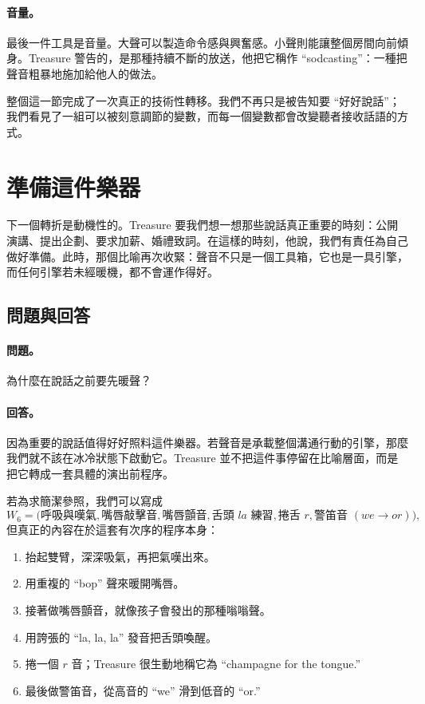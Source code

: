 \paragraph{音量。} 最後一件工具是音量。大聲可以製造命令感與興奮感。小聲則能讓整個房間向前傾身。Treasure 警告的，是那種持續不斷的放送，他把它稱作 ``sodcasting''：一種把聲音粗暴地施加給他人的做法。

整個這一節完成了一次真正的技術性轉移。我們不再只是被告知要 ``好好說話''；我們看見了一組可以被刻意調節的變數，而每一個變數都會改變聽者接收話語的方式。

\section{準備這件樂器}

下一個轉折是動機性的。Treasure 要我們想一想那些說話真正重要的時刻：公開演講、提出企劃、要求加薪、婚禮致詞。在這樣的時刻，他說，我們有責任為自己做好準備。此時，那個比喻再次收緊：聲音不只是一個工具箱，它也是一具引擎，而任何引擎若未經暖機，都不會運作得好。

\subsection{問題與回答}

\paragraph{問題。} 為什麼在說話之前要先暖聲？

\paragraph{回答。} 因為重要的說話值得好好照料這件樂器。若聲音是承載整個溝通行動的引擎，那麼我們就不該在冰冷狀態下啟動它。Treasure 並不把這件事停留在比喻層面，而是把它轉成一套具體的演出前程序。

若為求簡潔參照，我們可以寫成
\begin{equation}
W_6=
\bigl(
\text{呼吸與嘆氣},
\text{嘴唇敲擊音},
\text{嘴唇顫音},
\text{舌頭 } la\text{ 練習},
\text{捲舌 } r,
\text{警笛音 } (we \to or)
\bigr),
\end{equation}
但真正的內容在於這套有次序的程序本身：
\begin{enumerate}
\item 抬起雙臂，深深吸氣，再把氣嘆出來。
\item 用重複的 ``bop'' 聲來暖開嘴唇。
\item 接著做嘴唇顫音，就像孩子會發出的那種嗡嗡聲。
\item 用誇張的 ``la, la, la'' 發音把舌頭喚醒。
\item 捲一個 \(r\) 音；Treasure 很生動地稱它為 ``champagne for the tongue.''
\item 最後做警笛音，從高音的 ``we'' 滑到低音的 ``or.''
\end{enumerate}

